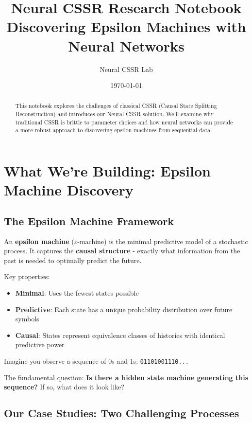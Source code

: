 \documentclass[11pt]{article}
\title{\Large \textbf{Neural CSSR Research Notebook} \\
       \large Discovering Epsilon Machines with Neural Networks}
\author{Neural CSSR Lab}
\date{\today}
\begin{document}
\maketitle

\begin{abstract}
This notebook explores the challenges of classical CSSR (Causal State Splitting Reconstruction) and introduces our Neural CSSR solution. We'll examine why traditional CSSR is brittle to parameter choices and how neural networks can provide a more robust approach to discovering epsilon machines from sequential data.
\end{abstract}

\section{What We're Building: Epsilon Machine Discovery}

\subsection{The Epsilon Machine Framework}

\begin{notebox}
An \textbf{epsilon machine} ($\varepsilon$-machine) is the minimal predictive model of a stochastic process. It captures the \textbf{causal structure} - exactly what information from the past is needed to optimally predict the future.

Key properties:
\begin{itemize}
\item \textbf{Minimal}: Uses the fewest states possible
\item \textbf{Predictive}: Each state has a unique probability distribution over future symbols
\item \textbf{Causal}: States represent equivalence classes of histories with identical predictive power
\end{itemize}
\end{notebox}

Imagine you observe a sequence of 0s and 1s: \texttt{01101001110...}

The fundamental question: \textbf{Is there a hidden state machine generating this sequence?} If so, what does it look like?

\subsection{Our Case Studies: Two Challenging Processes}
\end{document}
